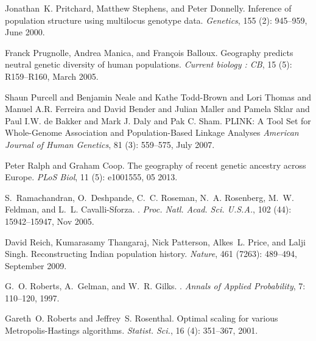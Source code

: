 \documentclass[10pt,letterpaper]{article}
\begin{document}
\begin{thebibliography}{80}
Jonathan~K. Pritchard, Matthew Stephens, and Peter Donnelly.
\newblock Inference of population structure using multilocus genotype data.
\newblock \emph{Genetics}, 155 (2): 945--959, June 2000.

Franck Prugnolle, Andrea Manica, and Fran{\c c}ois Balloux.
\newblock Geography predicts neutral genetic diversity of human populations.
\newblock \emph{Current biology : {CB}}, 15 (5): R159--R160,
  March 2005.

Shaun Purcell and Benjamin Neale and Kathe Todd-Brown and Lori Thomas and Manuel A.R. Ferreira and David Bender and Julian Maller and Pamela Sklar and Paul I.W. de Bakker and Mark J. Daly and Pak C. Sham.
\newblock PLINK: A Tool Set for Whole-Genome Association and Population-Based Linkage Analyses 
\newblock \emph{American Journal of Human Genetics}, 81 (3):
559--575, July 2007.

Peter Ralph and Graham Coop.
\newblock The geography of recent genetic ancestry across {Europe}.
\newblock \emph{PLoS Biol}, 11 (5): e1001555, 05 2013.

S.~Ramachandran, O.~Deshpande, C.~C. Roseman, N.~A. Rosenberg, M.~W. Feldman,
  and L.~L. Cavalli-Sforza.
.
\newblock \emph{Proc. Natl. Acad. Sci. U.S.A.}, 102 (44):
  15942--15947, Nov 2005.

David Reich, Kumarasamy Thangaraj, Nick Patterson, Alkes~L. Price, and Lalji
  Singh.
\newblock Reconstructing {Indian} population history.
\newblock \emph{Nature}, 461 (7263): 489--494, September
  2009.

G.~O. Roberts, A.~Gelman, and W.~R. Gilks.
.
\newblock \emph{Annals of Applied Probability}, 7: 110--120, 1997.

Gareth~O. Roberts and Jeffrey~S. Rosenthal.
\newblock Optimal scaling for various {M}etropolis-{H}astings algorithms.
\newblock \emph{Statist. Sci.}, 16 (4): 351--367, 2001.


\end{thebibliography}
\end{document}
